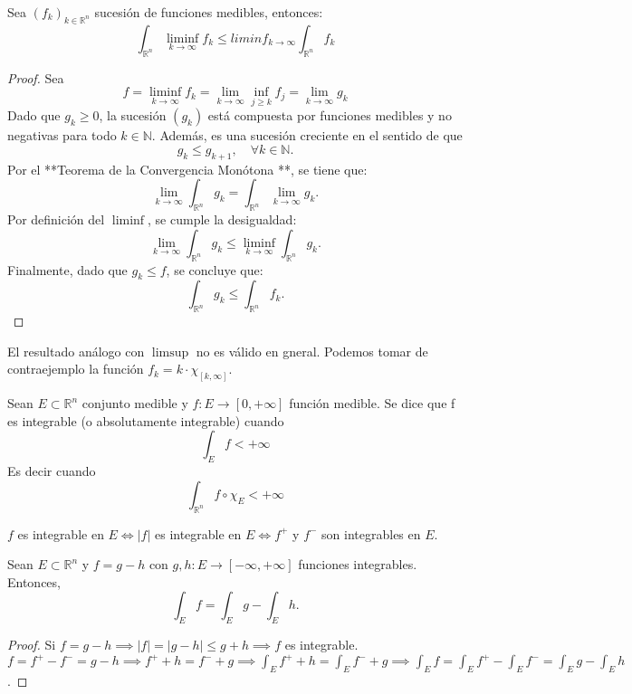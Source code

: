 \begin{lema}
    Sea $(f_k)_{k\in\mathbb{R}^n}$ sucesión de funciones medibles, entonces: $$\int_{\mathbb{R}^n}\liminf_{k\to\infty}f_k \leq liminf_{k\to\infty}\int_{\mathbb{R}^n}f_k$$
\end{lema}
\begin{proof}
    Sea $$ f = \liminf_{k \to \infty} f_k = \lim_{k \to \infty} \inf_{j \geq k} f_j = \lim_{k \to \infty} g_k $$
    Dado que $ g_k \geq 0 $, la sucesión $ (g_k) $ está compuesta por funciones medibles y no negativas para todo $ k \in \mathbb{N} $. Además, es una sucesión creciente en el sentido de que 
    $$ g_k \leq g_{k+1}, \quad \forall k \in \mathbb{N}. $$ Por el **Teorema de la Convergencia Monótona **, se tiene que:
    $$ \lim_{k \to \infty} \int_{\mathbb{R}^n} g_k = \int_{\mathbb{R}^n} \lim_{k \to \infty} g_k.$$ Por definición del $ \liminf $, se cumple la desigualdad:
    $$\lim_{k \to \infty} \int_{\mathbb{R}^n} g_k \leq \liminf_{k \to \infty} \int_{\mathbb{R}^n} g_k.$$
    Finalmente, dado que $ g_k \leq f $, se concluye que:
    $$\int_{\mathbb{R}^n} g_k \leq \int_{\mathbb{R}^n} f_k.$$
\end{proof}
\begin{observación}
    El resultado análogo con $\limsup$ no es válido en gneral. Podemos tomar de contraejemplo la función $f_k = k \cdot \chi_{[k, \infty]}$.
\end{observación}
\begin{definición}
    Sean $E \subset \mathbb{R}^n$ conjunto medible y $f: E \to [0, +\infty]$ función medible. Se dice que f es integrable (o absolutamente integrable) cuando $$\int_{E}f < +\infty$$ Es decir cuando $$\int_{\mathbb{R}^n}f\circ\chi_E < +\infty$$
\end{definición}
\begin{observación}
    $f$ es integrable en $E \iff |f|$ es integrable en $E \iff f^+ $ y $ f^-$ son integrables en $E$.
\end{observación}
\begin{lema}
    Sean $E \subset \mathbb{R}^n$ y $f = g - h$ con $g, h: E \to [-\infty, +\infty]$ funciones integrables. Entonces, $$ \int_{E}f = \int_{E}g - \int_{E}h.$$
\end{lema}
\begin{proof}
    Si $ f = g - h \implies  |f| = |g - h| \leq g + h \implies f$ es integrable.
    $f = f^+ - f^- = g - h \implies f^+ + h = f^- + g \implies \int_{E}f^+ + h = \int_{E}f^- + g \implies \int_{E}f = \int_{E}f^+ - \int_{E}f^- = \int_{E}g - \int_{E}h$. 
\end{proof}
